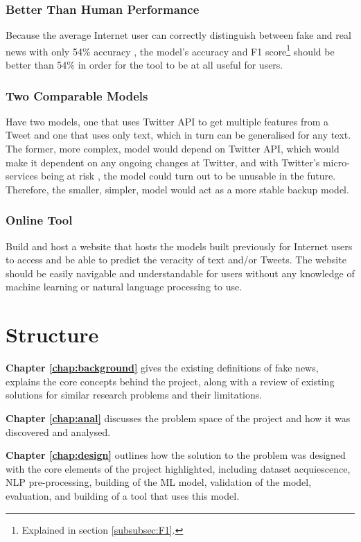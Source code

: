 \documentclass{l4proj}
\begin{document}
\subsubsection{Better Than Human Performance}
Because the average Internet user can correctly distinguish between fake and real news with only 54\% accuracy \citep{FakeNewsTrends}, the model's accuracy and F1 score\footnote{Explained in section \ref{subsubsec:F1}.} should be better than 54\% in order for the tool to be at all useful for users. 

\subsubsection{Two Comparable Models}
\label{subsec:goal_two_models}
Have two models, one that uses Twitter API to get multiple features from a Tweet and one that uses only text, which in turn can be generalised for any text. The former, more complex, model would depend on Twitter API, which would make it dependent on any ongoing changes at Twitter, and with Twitter's micro-services being at risk \citep{Twitter2FA}, the model could turn out to be unusable in the future. Therefore, the smaller, simpler, model would act as a more stable backup model.

\subsubsection{Online Tool}
Build and host a website that hosts the models built previously for Internet users to access and be able to predict the veracity of text and/or Tweets. The website should be easily navigable and understandable for users without any knowledge of machine learning or natural language processing to use.

\section{Structure}

\textbf{Chapter \ref{chap:background}} gives the existing definitions of fake news, explains the core concepts behind the project, along with a review of existing solutions for similar research problems and their limitations.

\textbf{Chapter \ref{chap:anal}} discusses the problem space of the project and how it was discovered and analysed.

\textbf{Chapter \ref{chap:design}} outlines how the solution to the problem was designed with the core elements of the project highlighted, including dataset acquiescence, NLP pre-processing, building of the ML model, validation of the model, evaluation, and building of a tool that uses this model.
\end{document}
